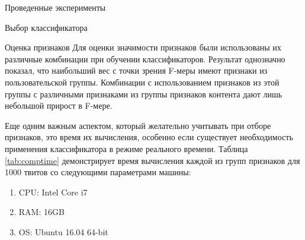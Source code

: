 \begin{section}{Проведенные эксперименты}
\begin{subsection}{Выбор классификатора}
\begin{table}[H]
\centering
{}

\caption{Сравнение показателей классификаторов}
\label{tab:results}
\end{table}



\end{subsection}


\begin{subsection}{Оценка признаков}
Для оценки значимости признаков были использованы их различные комбинации  при обучении классификаторов. Результат однозначно показал, что наибольший вес с точки зрения F-меры имеют признаки из пользовательской группы. Комбинации с использованием признаков из этой группы с различными признаками из группы признаков контента дают лишь небольшой прирост в F-мере.

Еще одним важным аспектом, который желательно учитывать при отборе признаков, это время их вычисления, особенно если существует необходимость применения классификатора в режиме реального времени. Таблица \ref{tab:comptime} демонстрирует время вычисления каждой из групп признаков для 1000 твитов со следующими параметрами машины:
\begin{enumerate}
\item CPU: Intel Core i7
\item RAM: 16GB
\item OS: Ubuntu 16.04 64-bit
\end{enumerate}



\begin{table}[H]
\centering
{}


\end{table}
\end{subsection}
\end{section}
